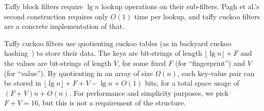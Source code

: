 \documentclass[sigconf]{acmart}
\newcommand{\etal}{et al.}
\begin{document}

Taffy block filters require $\lg n$ lookup operations on their sub-filters.
Pagh \etal{}'s second construction requires only $O(1)$ time per lookup, and taffy cuckoo filters are a concrete implementation of that.

Taffy cuckoo filters use quotienting cuckoo tables (as in backyard cuckoo hashing~\cite{backyard}) to store their data.
The keys are bit-strings of length $\lfloor \lg n \rfloor + F$ and the values are bit-strings of length $V$, for some fixed $F$ (for ``fingerprint'') and $V$ (for ``value'').
By quotienting in an array of size $\Omega(n)$, each key-value pair can be stored in $\lfloor \lg n \rfloor + F + V - \lg n + O(1)$ bits, for a total space usage of $(F+V)n + O(n)$.
For performance and simplicity purposes, we pick $F + V = 16$, but this is not a requirement of the structure.


\end{document}
